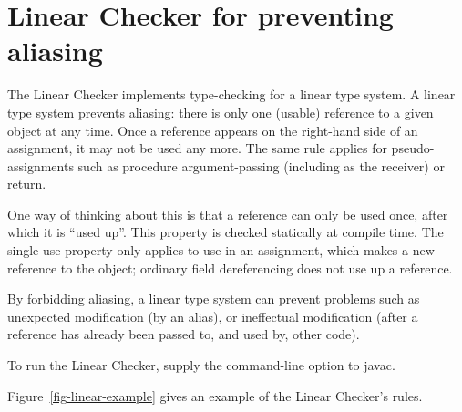 \htmlhr
\chapter{Linear Checker for preventing aliasing\label{linear-checker}}

The Linear Checker implements type-checking for a linear type system.  A
linear type system prevents aliasing:  there is only one (usable) reference
to a given object at any time.  Once a reference appears on the right-hand
side of an assignment, it may not be used any more.  The same rule applies
for pseudo-assignments such as procedure argument-passing (including as the
receiver) or return.

One way of thinking about this is that a reference can only be used once,
after which it is ``used up''.  This property is checked statically at
compile time.  The single-use property only applies to use in an
assignment, which makes a new reference to the object; ordinary field
dereferencing does not use up a reference.

By forbidding aliasing, a linear type system can prevent problems such as
unexpected modification (by an alias), or ineffectual modification (after a
reference has already been passed to, and used by, other code).




To run the Linear Checker, supply the  command-line option to javac.


Figure~\ref{fig-linear-example} gives an example of the Linear Checker's rules.

